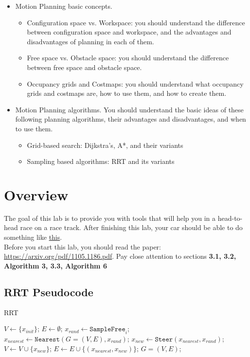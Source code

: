\documentclass[letta4 paper]{article}
\numberwithin{equation}{section}
\newcommand{\0}{\mathbf{0}}
\begin{document}
	\begin{itemize}
		\item Motion Planning basic concepts.
		\begin{itemize}
			\item Configuration space vs. Workspace: you should understand the difference between configuration space and workspace, and the advantages and disadvantages of planning in each of them.
			\item Free space vs. Obstacle space: you should understand the difference between free space and obstacle space.
			\item Occupancy grids and Costmaps: you should understand what occupancy grids and costmaps are, how to use them, and how to create them.
		\end{itemize}
		
		\item Motion Planning algorithms. You should understand the basic ideas of these following planning algorithms, their advantages and disadvantages, and when to use them.
		\begin{itemize}
			\item Grid-based search: Dijkstra's, A*, and their variants
			\item Sampling based algorithms: RRT and its variants
		\end{itemize}
		
	\end{itemize}
	
	\section{Overview}
	The goal of this lab is to provide you with tools that will help you in a head-to-head race on a race track. After finishing this lab, your car should be able to do something like
\href{https://www.youtube.com/watch?v=llHCRqwIllM}{this}.\\
	
	Before you start this lab, you should read the paper: \href{https://arxiv.org/pdf/1105.1186.pdf}{https://arxiv.org/pdf/1105.1186.pdf}. Pay close attention to sections \textbf{3.1, 3.2, Algorithm 3, 3.3, Algorithm 6}
	\subsection{RRT Pseudocode}
	\begin{algorithm}
		\caption{RRT}
		\begin{algorithmic}[1]
			\STATE $V \leftarrow \{x_{init}\}$; $E\leftarrow \emptyset$;
			\STATE $x_{rand}\leftarrow \texttt{SampleFree}_i$;
			\STATE $x_{nearest}\leftarrow \texttt{Nearest}(G=(V,E),x_{rand})$;
			\STATE $x_{new}\leftarrow\texttt{Steer}(x_{nearest},x_{rand})$;
			\STATE $V\leftarrow V\cup \{x_{new}\}$; $E\leftarrow E\cup \{(x_{nearest}, x_{new})\}$;
			\ENDIF
			\ENDFOR
			\RETURN $G=(V,E)$;
		\end{algorithmic}
	\end{algorithm}
	
\end{document}
